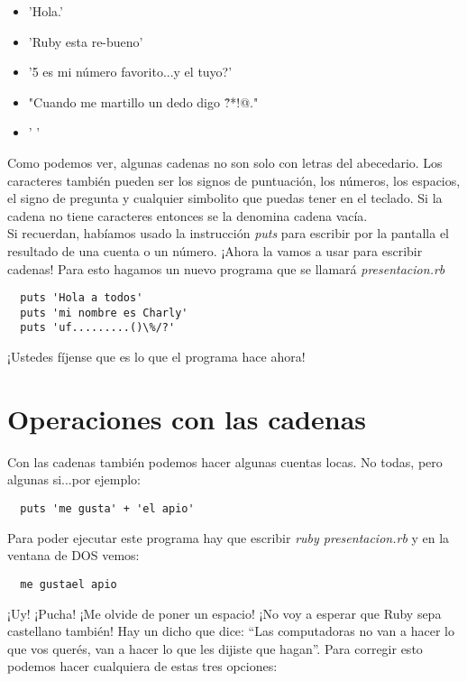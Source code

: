 \begin{itemize}
  \item 'Hola.'
  \item 'Ruby esta re-bueno'
  \item '5 es mi número favorito...y el tuyo?'
  \item "Cuando me martillo un dedo digo \^?*!@."
  \item ' '
\end{itemize}

Como podemos ver, algunas cadenas no son solo con letras del abecedario. Los caracteres también pueden ser los signos de puntuación, los números, los espacios, el signo de pregunta y cualquier simbolito que puedas tener en el teclado. Si la cadena no tiene caracteres entonces se la denomina cadena vacía.\\

Si recuerdan, habíamos usado la instrucción \emph{puts} para escribir por la pantalla el resultado de una cuenta o un número. ¡Ahora la vamos a usar para escribir cadenas! Para esto hagamos un nuevo programa que se llamará \emph{presentacion.rb}


\begin{lstlisting}
  puts 'Hola a todos'
  puts 'mi nombre es Charly'
  puts 'uf.........()\%/?'
\end{lstlisting}

¡Ustedes fíjense que es lo que el programa hace ahora!

\section{Operaciones con las cadenas}

Con las cadenas también podemos hacer algunas cuentas locas. No todas, pero algunas si...por ejemplo:

\begin{lstlisting}
  puts 'me gusta' + 'el apio'
\end{lstlisting}

Para poder ejecutar este programa hay que escribir \emph{ruby presentacion.rb} y en la ventana de DOS vemos:
\begin{lstlisting}
  me gustael apio
\end{lstlisting}

¡Uy! ¡Pucha! ¡Me olvide de poner un espacio! ¡No voy a esperar que Ruby sepa castellano también! Hay un dicho que dice: “Las computadoras no van a hacer lo que vos querés, van a hacer lo que les dijiste que hagan”. Para corregir esto podemos hacer cualquiera de estas tres opciones:

